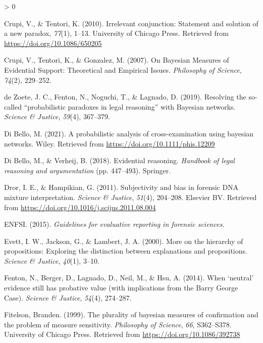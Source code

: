\documentclass[
  10pt,
  dvipsnames,enabledeprecatedfontcommands]{scrartcl}
\newlength{\cslhangindent}
\newenvironment{CSLReferences}[2] %
 {%
  \setlength{\parindent}{0pt}
  \ifodd #1 \everypar{\setlength{\hangindent}{\cslhangindent}}\ignorespaces\fi
  \ifnum #2 > 0
  \setlength{\parskip}{#2\baselineskip}
  \fi
 }%
 {}
\begin{document}
\begin{CSLReferences}{1}{0}
\leavevmode\hypertarget{ref-CrupiTentori2010irrelevant}{}%
Crupi, V., \& Tentori, K. (2010). Irrelevant conjunction: Statement and
solution of a new paradox, \emph{77}(1), 1--13. University of Chicago
Press. Retrieved from \url{https://doi.org/10.1086/650205}

\leavevmode\hypertarget{ref-crupi2007BayesianMeasuresEvidential}{}%
Crupi, V., Tentori, K., \& Gonzalez, M. (2007). On {Bayesian Measures}
of {Evidential Support}: {Theoretical} and {Empirical Issues}.
\emph{Philosophy of Science}, \emph{74}(2), 229--252.

\leavevmode\hypertarget{ref-dezoete2019ResolvingSocalledProbabilistic}{}%
de Zoete, J. C., Fenton, N., Noguchi, T., \& Lagnado, D. (2019).
Resolving the so-called {``probabilistic paradoxes in legal reasoning''}
with {Bayesian} networks. \emph{Science \& Justice}, \emph{59}(4),
367--379.

\leavevmode\hypertarget{ref-Bello2021probabilisticCrossexamination}{}%
Di Bello, M. (2021). A probabilistic analysis of cross-examination using
bayesian networks. Wiley. Retrieved from
\url{https://doi.org/10.1111/phis.12209}

\leavevmode\hypertarget{ref-di2018evidential}{}%
Di Bello, M., \& Verheij, B. (2018). Evidential reasoning.
\emph{Handbook of legal reasoning and argumentation} (pp. 447--493).
Springer.

\leavevmode\hypertarget{ref-Dror2011subjectivity}{}%
Dror, I. E., \& Hampikian, G. (2011). Subjectivity and bias in forensic
{DNA} mixture interpretation. \emph{Science {\&} Justice}, \emph{51}(4),
204--208. Elsevier {BV}. Retrieved from
\url{https://doi.org/10.1016/j.scijus.2011.08.004}

\leavevmode\hypertarget{ref-enfs2015}{}%
ENFSI. (2015). \emph{Guidelines for evaluative reporting in forensic
sciences}.

\leavevmode\hypertarget{ref-evett2000MoreHierarchyPropositions}{}%
Evett, I. W., Jackson, G., \& Lambert, J. A. (2000). More on the
hierarchy of propositions: Exploring the distinction between
explanations and propositions. \emph{Science \& Justice}, \emph{40}(1),
3--10.

\leavevmode\hypertarget{ref-fenton2014WhenNeutralEvidence}{}%
Fenton, N., Berger, D., Lagnado, D., Neil, M., \& Hsu, A. (2014). When
{`neutral'} evidence still has probative value (with implications from
the {Barry George Case}). \emph{Science \& Justice}, \emph{54}(4),
274--287.

\leavevmode\hypertarget{ref-Fitelson1999plurality}{}%
Fitelson, Branden. (1999). The plurality of bayesian measures of
confirmation and the problem of measure sensitivity. \emph{Philosophy of
Science}, \emph{66}, S362--S378. University of Chicago Press. Retrieved
from \url{https://doi.org/10.1086/392738}


\end{CSLReferences}
\end{document}
